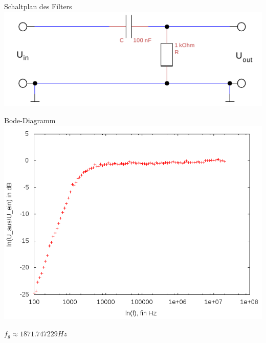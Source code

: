 \documentclass[compress,11pt]{beamer}
\begin{document}
\begin{frame}\begin{block}{Schaltplan des Filters}
\includegraphics[width=\textwidth]{../daten/Messdaten/plots/schalt_hoch}
\end{block}\end{frame}
\begin{frame}\begin{block}{Bode-Diagramm}
\includegraphics[width=.7\textwidth]{../daten/Messdaten/plots/Aufgabe2Bodediagramm_hochpass_gain}
\end{block}

$f_g \approx  1871.747229 Hz$
\end{frame}
\end{document}
